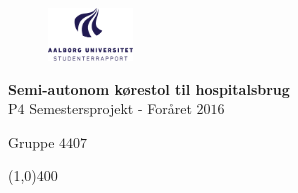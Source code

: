 \clearpage
\thispagestyle{empty}

\begin{figure}[H]
	\raggedleft
		\includegraphics[width=0.2\textwidth]{figures/aaulogo-da.png}
\end{figure} 
\vspace*{\fill} 
\begin{center}	
\begin{Huge}
\textbf{Semi-autonom kørestol til hospitalsbrug}\\
\vspace{5 mm}
P$4$ Semestersprojekt - Foråret $2016$\\
\vspace{3 mm}
\end{Huge}
{\Large Gruppe $4407$}
\end{center}
\vspace*{\fill}

\begin{center}
\line(1,0){400}
\end{center}